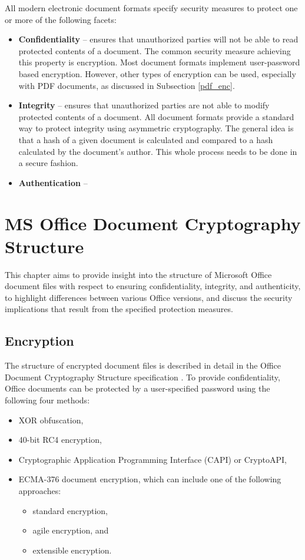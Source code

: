 \documentclass[11pt,oneside]{fithesis2}
\begin{document}
All modern electronic document formats specify security measures to protect one or more of the following facets:

\begin{itemize}
\setlength\itemsep{0.1em}
\item{\textbf{Confidentiality} -- ensures that unauthorized parties will not be able to read protected contents of a document. The common security measure achieving this property is encryption. Most document formats implement user-password based encryption. However, other types of encryption can be used, especially with PDF documents, as discussed in Subsection \ref{pdf_enc}.}
\item{\textbf{Integrity} -- ensures that unauthorized parties are not able to modify protected contents of a document. All document formats provide a standard way to protect integrity using asymmetric cryptography. The general idea is that a hash of a given document is calculated and compared to a hash calculated by the document's author. This whole process needs to be done in a secure fashion.}
\item{\textbf{Authentication} -- }
\end{itemize}

\chapter{MS Office Document Cryptography Structure}

This chapter aims to provide insight into the structure of Microsoft Office document files with respect to ensuring confidentiality, integrity, and authenticity, to highlight differences between various Office versions, and discuss the security implications that result from the specified protection measures.

\section{Encryption}\label{ms_encryption}

The structure of encrypted document files is described in detail in the Office Document Cryptography Structure specification \cite{msoffcrypto}. To provide confidentiality, Office documents can be protected by a user-specified password using the following four methods:
\begin{itemize}
\setlength\itemsep{0.1em}
\item{XOR obfuscation,}
\item{40-bit RC4 encryption,}
\item{Cryptographic Application Programming Interface (CAPI) or CryptoAPI,}
\item{ECMA-376 document encryption, which can include one of the following approaches: }
	\begin{itemize}
	\setlength\itemsep{0.1em}
	\item{standard encryption,}
	\item{agile encryption, and}
	\item{extensible encryption.}
	\end{itemize}
\end{itemize}
\end{document}
